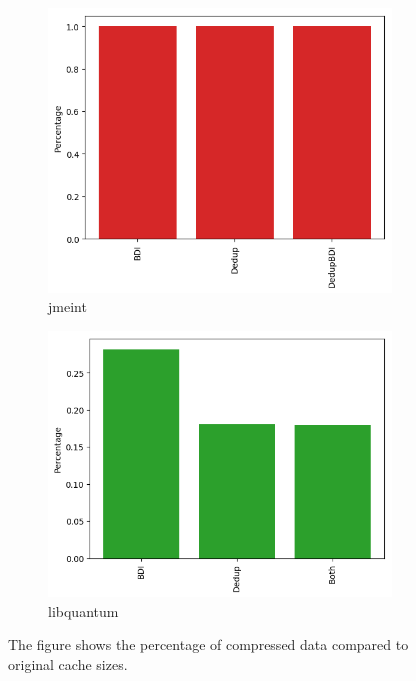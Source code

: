 \begin{figure}
\begin{subfigure}{\textwidth}
        \includegraphics[width=\textwidth]{jmeint.png}
        \caption{jmeint}
        \label{fig:jmeint}
    \end{subfigure}
    \begin{subfigure}{\textwidth}
        \includegraphics[width=\textwidth]{libquantum.png}
        \caption{libquantum}
        \label{fig:libquantum}
    \end{subfigure}
    \caption[Compression in benchmarks]{The figure shows the percentage of compressed data compared to original cache sizes.}
\end{figure}
